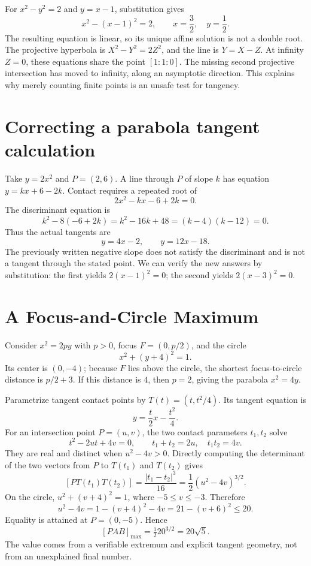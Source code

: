 For \(x^2-y^2=2\) and \(y=x-1\), substitution gives
\[
 x^2-(x-1)^2=2,\qquad x=\frac32,\quad y=\frac12.
\]
The resulting equation is linear, so its unique affine solution is not a double root. The projective hyperbola is \(X^2-Y^2=2Z^2\), and the line is \(Y=X-Z\). At infinity \(Z=0\), these equations share the point \([1:1:0]\). The missing second projective intersection has moved to infinity, along an asymptotic direction. This explains why merely counting finite points is an unsafe test for tangency.

\section{Correcting a parabola tangent calculation}

Take \(y=2x^2\) and \(P=(2,6)\). A line through \(P\) of slope \(k\) has equation \(y=kx+6-2k\). Contact requires a repeated root of
\[
 2x^2-kx-6+2k=0.
\]
The discriminant equation is
\[
 k^2-8(-6+2k)=k^2-16k+48=(k-4)(k-12)=0.
\]
Thus the actual tangents are
\[
 \boxed{y=4x-2,\qquad y=12x-18.}
\]
The previously written negative slope does not satisfy the discriminant and is not a tangent through the stated point. We can verify the new answers by substitution: the first yields \(2(x-1)^2=0\); the second yields \(2(x-3)^2=0\).

\section{A Focus-and-Circle Maximum}

Consider \(x^2=2py\) with \(p>0\), focus \(F=(0,p/2)\), and the circle
\[
 x^2+(y+4)^2=1.
\]
Its center is \((0,-4)\); because \(F\) lies above the circle, the shortest focus-to-circle distance is \(p/2+3\). If this distance is \(4\), then \(p=2\), giving the parabola \(x^2=4y\).

Parametrize tangent contact points by \(T(t)=(t,t^2/4)\). Its tangent equation is
\[
 y=\frac t2x-\frac{t^2}{4}.
\]
For an intersection point \(P=(u,v)\), the two contact parameters \(t_1,t_2\) solve
\[
 t^2-2ut+4v=0,\qquad
 t_1+t_2=2u,\quad t_1t_2=4v.
\]
They are real and distinct when \(u^2-4v>0\). Directly computing the determinant of the two vectors from \(P\) to \(T(t_1)\) and \(T(t_2)\) gives
\[
 [PT(t_1)T(t_2)]
 =\frac{|t_1-t_2|^3}{16}
 =\frac12(u^2-4v)^{3/2}.
\]
On the circle, \(u^2+(v+4)^2=1\), where \(-5\le v\le-3\). Therefore
\[
 u^2-4v=1-(v+4)^2-4v=21-(v+6)^2\le20.
\]
Equality is attained at \(P=(0,-5)\). Hence
\[
 \boxed{[PAB]_{\max}=\tfrac12 20^{3/2}=20\sqrt5.}
\]
The value comes from a verifiable extremum and explicit tangent geometry, not from an unexplained final number.


